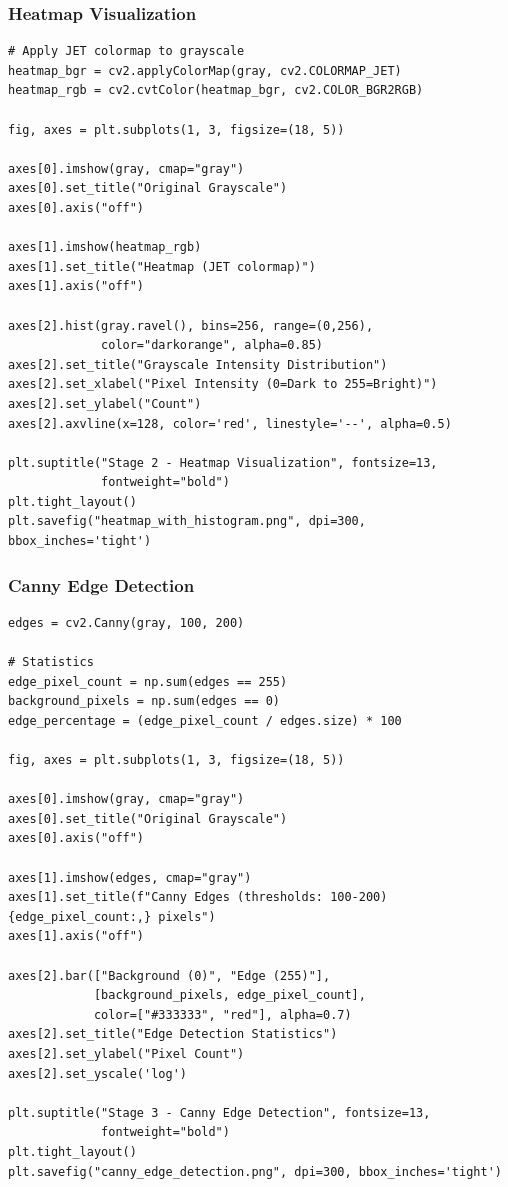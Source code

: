 \documentclass[12pt,a4paper]{article}
\begin{document}
\subsubsection{Heatmap Visualization}

\begin{lstlisting}
# Apply JET colormap to grayscale
heatmap_bgr = cv2.applyColorMap(gray, cv2.COLORMAP_JET)
heatmap_rgb = cv2.cvtColor(heatmap_bgr, cv2.COLOR_BGR2RGB)

fig, axes = plt.subplots(1, 3, figsize=(18, 5))

axes[0].imshow(gray, cmap="gray")
axes[0].set_title("Original Grayscale")
axes[0].axis("off")

axes[1].imshow(heatmap_rgb)
axes[1].set_title("Heatmap (JET colormap)")
axes[1].axis("off")

axes[2].hist(gray.ravel(), bins=256, range=(0,256), 
             color="darkorange", alpha=0.85)
axes[2].set_title("Grayscale Intensity Distribution")
axes[2].set_xlabel("Pixel Intensity (0=Dark to 255=Bright)")
axes[2].set_ylabel("Count")
axes[2].axvline(x=128, color='red', linestyle='--', alpha=0.5)

plt.suptitle("Stage 2 - Heatmap Visualization", fontsize=13, 
             fontweight="bold")
plt.tight_layout()
plt.savefig("heatmap_with_histogram.png", dpi=300, bbox_inches='tight')
\end{lstlisting}

\subsubsection{Canny Edge Detection}

\begin{lstlisting}
edges = cv2.Canny(gray, 100, 200)

# Statistics
edge_pixel_count = np.sum(edges == 255)
background_pixels = np.sum(edges == 0)
edge_percentage = (edge_pixel_count / edges.size) * 100

fig, axes = plt.subplots(1, 3, figsize=(18, 5))

axes[0].imshow(gray, cmap="gray")
axes[0].set_title("Original Grayscale")
axes[0].axis("off")

axes[1].imshow(edges, cmap="gray")
axes[1].set_title(f"Canny Edges (thresholds: 100-200) {edge_pixel_count:,} pixels")
axes[1].axis("off")

axes[2].bar(["Background (0)", "Edge (255)"], 
            [background_pixels, edge_pixel_count],
            color=["#333333", "red"], alpha=0.7)
axes[2].set_title("Edge Detection Statistics")
axes[2].set_ylabel("Pixel Count")
axes[2].set_yscale('log')

plt.suptitle("Stage 3 - Canny Edge Detection", fontsize=13, 
             fontweight="bold")
plt.tight_layout()
plt.savefig("canny_edge_detection.png", dpi=300, bbox_inches='tight')
\end{lstlisting}
\end{document}
